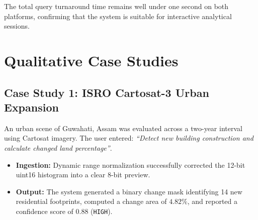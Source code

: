 \documentclass[12pt,a4paper]{report}
\begin{document}
\begin{table}[htbp]
\centering
\caption{Execution Latency Breakdown Across Hardware Environments}\label{tab:latency_benchmarks}
\end{table}

The total query turnaround time remains well under one second on both platforms, confirming that the system is suitable for interactive analytical sessions.

\section{Qualitative Case Studies}

\subsection{Case Study 1: ISRO Cartosat-3 Urban Expansion}
An urban scene of Guwahati, Assam was evaluated across a two-year interval using Cartosat imagery. The user entered: \textit{``Detect new building construction and calculate changed land percentage''}.
\begin{itemize}
    \item \textbf{Ingestion:} Dynamic range normalization successfully corrected the 12-bit uint16 histogram into a clear 8-bit preview.
    \item \textbf{Output:} The system generated a binary change mask identifying 14 new residential footprints, computed a change area of $4.82\%$, and reported a confidence score of $0.88$ (\texttt{HIGH}).
\end{itemize}
\end{document}
